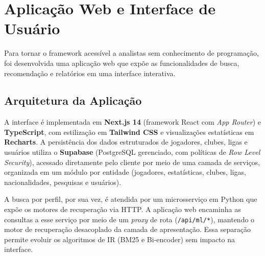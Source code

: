 \documentclass[portuguese]{sbc2025}
\begin{document}
\section{Aplicação Web e Interface de Usuário}
\label{sec:webapp}

Para tornar o framework acessível a analistas sem conhecimento de programação,
foi desenvolvida uma aplicação web que expõe as funcionalidades de busca,
recomendação e relatórios em uma interface interativa.

\subsection{Arquitetura da Aplicação}
A interface é implementada em \textbf{Next.js 14} (framework React com
\emph{App Router}) e \textbf{TypeScript}, com estilização em
\textbf{Tailwind CSS} e visualizações estatísticas em \textbf{Recharts}. A
persistência dos dados estruturados de jogadores, clubes, ligas e usuários
utiliza o \textbf{Supabase} (PostgreSQL gerenciado, com políticas de
\emph{Row Level Security}), acessado diretamente pelo cliente por meio de uma
camada de serviços, organizada em um módulo por entidade (jogadores,
estatísticas, clubes, ligas, nacionalidades, pesquisas e usuários).

A busca por perfil, por sua vez, é atendida por um microsserviço em Python que
expõe os motores de recuperação via HTTP. A aplicação web encaminha as consultas
a esse serviço por meio de um \emph{proxy} de rota (\texttt{/api/ml/*}),
mantendo o motor de recuperação desacoplado da camada de apresentação. Essa
separação permite evoluir os algoritmos de IR (BM25 e Bi-encoder) sem impacto na
interface.
\end{document}
